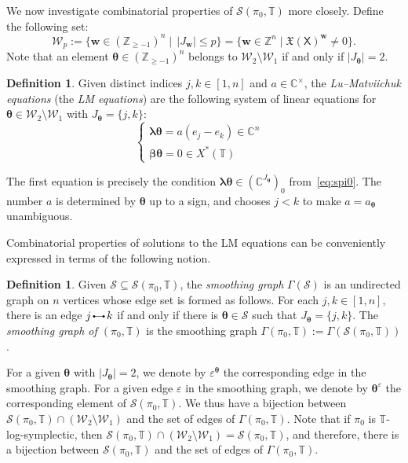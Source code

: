 \documentclass[11pt]{article}
\newcommand{\bbeta}{\boldsymbol{\beta}}
\newcommand{\blambda}{\boldsymbol{\lambda}}
\newcommand{\btheta}{{\boldsymbol{\theta}}}
\newcommand{\bw}{\mathbf{w}}
\theoremstyle{definition}\newtheorem{definition}[theorem]{Definition}
\theoremstyle{definition}\newtheorem{remark}[theorem]{Remark}
\theoremstyle{remark}
\numberwithin{equation}{section}
\newcommand{\edge}{\,
	\begin{tikzpicture}
		\draw (0,.5ex) -- (2ex,.5ex);
		\draw[fill] (0,.5ex) circle (.2ex);
		\draw[fill] (2ex,.5ex) circle (.2ex);
		\draw[fill] (0,0) circle (0);
	\end{tikzpicture}\,
}
\begin{document}
We now investigate combinatorial properties of $\mathcal{S}(\pi_0,\mathbb{T})$ more closely. Define the following set:
\begin{equation*}
    \mathcal{W}_p := \{\bw \in (\mathbb{Z}_{\geq -1})^n \mid \, |J_{\bw}| \leq p\} = \{\mathbf{w}\in \mathbb{Z}^n\mid \mathfrak{X}(\mathsf{X})^\mathbf{w} \neq 0\}.
\end{equation*}
Note that an element $\btheta \in (\mathbb{Z}_{\geq -1})^n$ belongs to $\mathcal{W}_2 \setminus \mathcal{W}_1$ if and only if $|J_{\btheta}| = 2$.

\begin{definition}
    Given distinct indices $j,k \in [1,n]$ and $a \in \mathbb{C}^\times$, the \emph{Lu--Matviichuk equations} (the \emph{LM equations}) are the following system of linear equations for $\btheta\in  \mathcal{W}_2 \setminus \mathcal{W}_1$ with $J_{\btheta} = \{j,k\}$:
    \begin{equation*}
        \begin{cases}
            \blambda \btheta = a(e_j - e_k) \in \mathbb{C}^n&\\
            \bbeta \btheta = 0 \in X^*(\mathbb{T})
        \end{cases}
    \end{equation*}
\end{definition}
The first equation is precisely the condition $\blambda \btheta \in (\mathbb{C}^{J_{\btheta}})_0$ from~\eqref{eq:spi0}. The number $a$ is determined by $\btheta$ up to a sign, and \cite{lm-deform} chooses $j<k$ to make $a=a_{\btheta}$ unambiguous.

Combinatorial properties of solutions to the LM equations can be conveniently expressed in terms of the following notion.
\begin{definition}
    Given $\mathcal{S}\subseteq \mathcal{S}(\pi_0,\mathbb{T})$, the \emph{smoothing graph} $\Gamma(\mathcal{S})$ is an undirected graph on $n$ vertices whose edge set is formed as follows. For each $j,k \in [1,n]$, there is an edge $j\edge k$ if and only if there is $\btheta \in \mathcal{S}$ such that $J_{\btheta} = \{j,k\}$. The \emph{smoothing graph of $(\pi_0,\mathbb{T})$} is the smoothing graph $\Gamma(\pi_0,\mathbb{T}) := \Gamma(\mathcal{S}(\pi_0,\mathbb{T}))$.
\end{definition}
For a given $\btheta$ with $|J_{\btheta}| = 2$, we denote by $\varepsilon^{\btheta}$ the corresponding edge in the smoothing graph. For a given edge $\varepsilon$ in the smoothing graph, we denote by $\btheta^{\varepsilon}$ the corresponding element of $\mathcal{S}(\pi_0,\mathbb{T})$. We thus have a bijection between $\mathcal{S}(\pi_0,\mathbb{T}) \cap (\mathcal{W}_2 \setminus \mathcal{W}_1)$ and the set of edges of $\Gamma(\pi_0,\mathbb{T})$. Note that if $\pi_0$ is $\mathbb{T}$-log-symplectic, then $\mathcal{S}(\pi_0,\mathbb{T}) \cap (\mathcal{W}_2\setminus\mathcal{W}_1) = \mathcal{S}(\pi_0,\mathbb{T})$, and therefore, there is a bijection between $\mathcal{S}(\pi_0,\mathbb{T})$ and the set of edges of $\Gamma(\pi_0,\mathbb{T})$.
\end{document}
